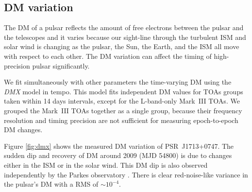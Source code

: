 

\subsection{DM variation}
\label{sec:dmx}
The DM of a pulsar reflects the amount of free electrons between
the pulsar and the telescopes and it varies because
our sight-line through the turbulent ISM and solar wind is changing as the
pulsar, the Sun, the Earth, and the ISM all move with respect to each other.
The DM variation can affect the timing of high-precision pulsar significantly.

{\bfref
We fit simultaneously with other parameters the time-varying DM using the {\it DMX} model in {\sc tempo}.
This model fits independent DM values for TOAs groups taken within 14 days
intervals, except for the L-band-only Mark~III TOAs. We grouped the Mark~III
TOAs together as a single group, because their frequency resolution and timing
precision are not sufficient for measuring epoch-to-epoch DM changes.


Figure \ref{fig:dmx} shows the measured DM variation of PSR~J1713+0747.
The sudden dip and recovery of DM around 2009 (MJD 54800) is 
due to changes either in the ISM or in the solar wind. This DM dip is also
observed independently by the Parkes observatory \citep{kcs+13}.
There is clear red-noise-like variance in the pulsar's DM with a RMS of
$\sim10^{-4}$. 
}

